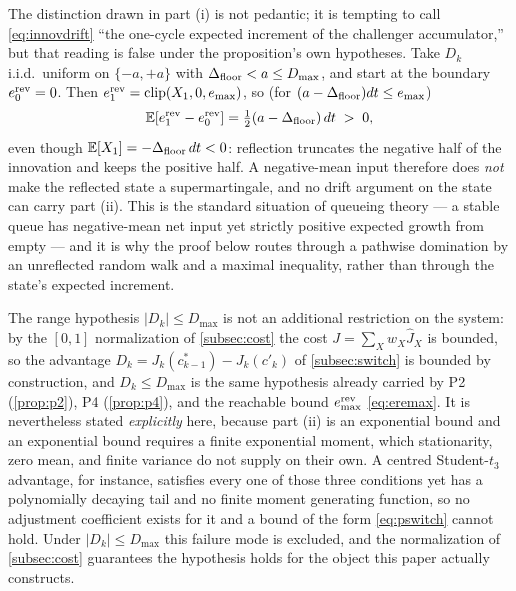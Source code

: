 \begin{remark} \label{rem:boundarydrift}
The distinction drawn in part (i) is not pedantic; it is tempting to call \eqref{eq:innovdrift} ``the one-cycle expected increment of the challenger accumulator,'' but that reading is false under the proposition's own hypotheses. Take $D_k$ i.i.d.\ uniform on $\{-a, +a\}$ with $\Delta_{\text{floor}} < a \le D_{\max}$, and start at the boundary $e^{\text{rev}}_0 = 0$. Then $e^{\text{rev}}_1 = \mathrm{clip}(X_1, 0, e_{\max})$, so (for $(a-\Delta_{\text{floor}})dt \le e_{\max}$)
\begin{equation}
\mathbb{E}[e^{\text{rev}}_1 - e^{\text{rev}}_0] = \tfrac{1}{2}(a - \Delta_{\text{floor}})\,dt \;>\; 0,
\end{equation}
even though $\mathbb{E}[X_1] = -\Delta_{\text{floor}}\,dt < 0$: reflection truncates the negative half of the innovation and keeps the positive half. A negative-mean input therefore does \emph{not} make the reflected state a supermartingale, and no drift argument on the state can carry part (ii). This is the standard situation of queueing theory --- a stable queue has negative-mean net input yet strictly positive expected growth from empty --- and it is why the proof below routes through a pathwise domination by an unreflected random walk and a maximal inequality, rather than through the state's expected increment.
\end{remark}

\begin{remark}
The range hypothesis $|D_k| \le D_{\max}$ is not an additional restriction on the system: by the $[0,1]$ normalization of \cref{subsec:cost} the cost $J = \sum_X w_X \hat J_X$ is bounded, so the advantage $D_k = J_k(c^*_{k-1}) - J_k(c'_k)$ of \cref{subsec:switch} is bounded by construction, and $D_k \le D_{\max}$ is the same hypothesis already carried by P2 (\cref{prop:p2}), P4 (\cref{prop:p4}), and the reachable bound $e^{\text{rev}}_{\max}$ \eqref{eq:eremax}. It is nevertheless stated \emph{explicitly} here, because part (ii) is an exponential bound and an exponential bound requires a finite exponential moment, which stationarity, zero mean, and finite variance do not supply on their own. A centred Student-$t_3$ advantage, for instance, satisfies every one of those three conditions yet has a polynomially decaying tail and no finite moment generating function, so no adjustment coefficient exists for it and a bound of the form \eqref{eq:pswitch} cannot hold. Under $|D_k| \le D_{\max}$ this failure mode is excluded, and the normalization of \cref{subsec:cost} guarantees the hypothesis holds for the object this paper actually constructs.
\end{remark}

